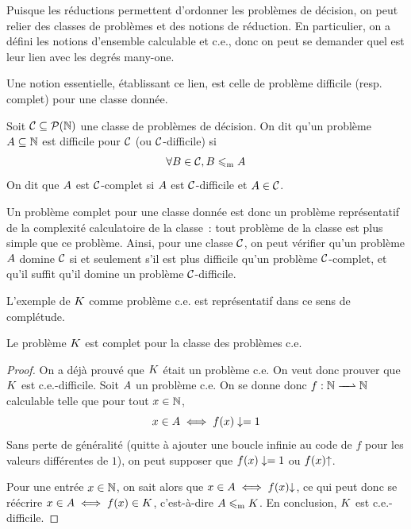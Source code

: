 Puisque les réductions permettent d'ordonner les problèmes de décision, on peut
relier des classes de problèmes et des notions de réduction. En particulier,
on a défini les notions d'ensemble calculable et c.e., donc on peut se demander
quel est leur lien avec les degrés many-one.

Une notion essentielle, établissant ce lien, est celle de problème difficile
(resp. complet) pour une classe donnée.

\begin{definition}
  Soit $\mathcal{C} \subseteq \mathcal{P}(\mathbb N)$ une classe de problèmes de
  décision. On dit qu'un problème $A\subseteq \mathbb N$ est difficile pour
  $\mathcal{C}$ (ou $\mathcal{C}$-difficile) si
  \[\forall B \in \mathcal{C}, B \leqslant_{\mathrm{m}} A\]
  On dit que $A$ est $\mathcal{C}$-complet si $A$ est $\mathcal{C}$-difficile et
  $A \in \mathcal{C}$.
\end{definition}

Un problème complet pour une classe donnée est donc un problème représentatif de
la complexité calculatoire de la classe~: tout problème de la classe est plus
simple que ce problème. Ainsi, pour une classe $\mathcal{C}$, on peut vérifier qu'un
problème $A$ domine $\mathcal{C}$ si et seulement s'il est plus difficile qu'un
problème $\mathcal{C}$-complet, et qu'il suffit qu'il domine un problème
$\mathcal{C}$-difficile.

L'exemple de $K$ comme problème c.e. est représentatif dans ce sens de
complétude.

\begin{proposition}
  Le problème $K$ est complet pour la classe des problèmes c.e.
\end{proposition}

\begin{proof}
  On a déjà prouvé que $K$ était un problème c.e. On veut donc
  prouver que $K$ est c.e.-difficile. Soit $A$ un problème c.e. On se
  donne donc $\makeFunNamePartial{f}{\bN}{\bN}$ calculable telle que pour tout
  $x \in \mathbb N$,
  \[x \in A \iff f(x) \mathrel{\mathord{\mathbin{\downarrow}}\mathord{=}} 1\]
  Sans perte de généralité (quitte à ajouter une boucle infinie au code de $f$
  pour les valeurs différentes de $1$), on peut supposer que $f(x) \mathrel{\mathord{\mathbin{\downarrow}}\mathord{=}} 1$
  ou $f(x) \mathbin{\uparrow}$.

  Pour une entrée $x \in \mathbb N$, on sait alors que
  $x \in A \iff f(x) \mathbin{\downarrow}$, ce qui peut donc se réécrire
  $x \in A \iff f(x) \in K$, c'est-à-dire $A \leqslant_{\mathrm{m}} K$.
  En conclusion, $K$ est c.e.-difficile.
\end{proof}


